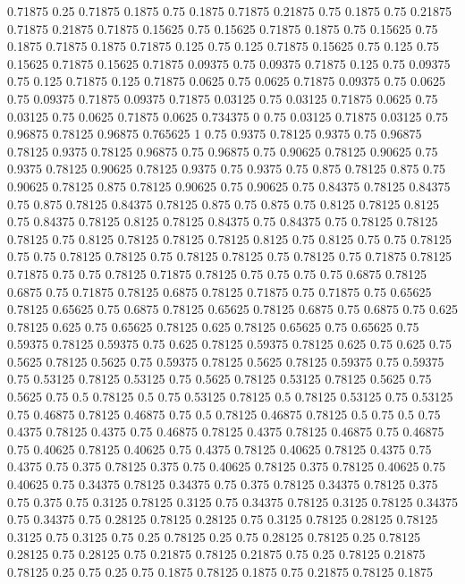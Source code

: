 0.71875 0.25
0.71875 0.1875
0.75 0.1875
0.71875 0.21875
0.75 0.1875
0.75 0.21875
0.71875 0.21875
0.71875 0.15625
0.75 0.15625
0.71875 0.1875
0.75 0.15625
0.75 0.1875
0.71875 0.1875
0.71875 0.125
0.75 0.125
0.71875 0.15625
0.75 0.125
0.75 0.15625
0.71875 0.15625
0.71875 0.09375
0.75 0.09375
0.71875 0.125
0.75 0.09375
0.75 0.125
0.71875 0.125
0.71875 0.0625
0.75 0.0625
0.71875 0.09375
0.75 0.0625
0.75 0.09375
0.71875 0.09375
0.71875 0.03125
0.75 0.03125
0.71875 0.0625
0.75 0.03125
0.75 0.0625
0.71875 0.0625
0.734375 0
0.75 0.03125
0.71875 0.03125
0.75 0.96875
0.78125 0.96875
0.765625 1
0.75 0.9375
0.78125 0.9375
0.75 0.96875
0.78125 0.9375
0.78125 0.96875
0.75 0.96875
0.75 0.90625
0.78125 0.90625
0.75 0.9375
0.78125 0.90625
0.78125 0.9375
0.75 0.9375
0.75 0.875
0.78125 0.875
0.75 0.90625
0.78125 0.875
0.78125 0.90625
0.75 0.90625
0.75 0.84375
0.78125 0.84375
0.75 0.875
0.78125 0.84375
0.78125 0.875
0.75 0.875
0.75 0.8125
0.78125 0.8125
0.75 0.84375
0.78125 0.8125
0.78125 0.84375
0.75 0.84375
0.75 0.78125
0.78125 0.78125
0.75 0.8125
0.78125 0.78125
0.78125 0.8125
0.75 0.8125
0.75 0.75
0.78125 0.75
0.75 0.78125
0.78125 0.75
0.78125 0.78125
0.75 0.78125
0.75 0.71875
0.78125 0.71875
0.75 0.75
0.78125 0.71875
0.78125 0.75
0.75 0.75
0.75 0.6875
0.78125 0.6875
0.75 0.71875
0.78125 0.6875
0.78125 0.71875
0.75 0.71875
0.75 0.65625
0.78125 0.65625
0.75 0.6875
0.78125 0.65625
0.78125 0.6875
0.75 0.6875
0.75 0.625
0.78125 0.625
0.75 0.65625
0.78125 0.625
0.78125 0.65625
0.75 0.65625
0.75 0.59375
0.78125 0.59375
0.75 0.625
0.78125 0.59375
0.78125 0.625
0.75 0.625
0.75 0.5625
0.78125 0.5625
0.75 0.59375
0.78125 0.5625
0.78125 0.59375
0.75 0.59375
0.75 0.53125
0.78125 0.53125
0.75 0.5625
0.78125 0.53125
0.78125 0.5625
0.75 0.5625
0.75 0.5
0.78125 0.5
0.75 0.53125
0.78125 0.5
0.78125 0.53125
0.75 0.53125
0.75 0.46875
0.78125 0.46875
0.75 0.5
0.78125 0.46875
0.78125 0.5
0.75 0.5
0.75 0.4375
0.78125 0.4375
0.75 0.46875
0.78125 0.4375
0.78125 0.46875
0.75 0.46875
0.75 0.40625
0.78125 0.40625
0.75 0.4375
0.78125 0.40625
0.78125 0.4375
0.75 0.4375
0.75 0.375
0.78125 0.375
0.75 0.40625
0.78125 0.375
0.78125 0.40625
0.75 0.40625
0.75 0.34375
0.78125 0.34375
0.75 0.375
0.78125 0.34375
0.78125 0.375
0.75 0.375
0.75 0.3125
0.78125 0.3125
0.75 0.34375
0.78125 0.3125
0.78125 0.34375
0.75 0.34375
0.75 0.28125
0.78125 0.28125
0.75 0.3125
0.78125 0.28125
0.78125 0.3125
0.75 0.3125
0.75 0.25
0.78125 0.25
0.75 0.28125
0.78125 0.25
0.78125 0.28125
0.75 0.28125
0.75 0.21875
0.78125 0.21875
0.75 0.25
0.78125 0.21875
0.78125 0.25
0.75 0.25
0.75 0.1875
0.78125 0.1875
0.75 0.21875
0.78125 0.1875
